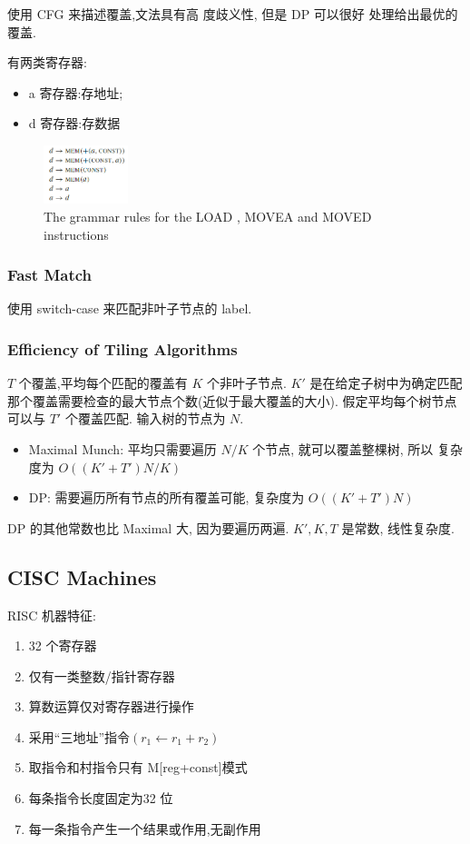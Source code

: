 使用 CFG 来描述覆盖,文法具有高 度歧义性, 但是 DP 可以很好 处理给出最优的覆盖.

有两类寄存器:
\begin{itemize}
    \item a 寄存器:存地址;
    \item d 寄存器:存数据
\end{itemize}

\begin{figure}[!htb]
    \centering
    \includegraphics[width=0.22\textwidth]{pic/CP9/The grammar rules}
    \caption{The grammar rules for the LOAD , MOVEA and MOVED instructions}
\end{figure}


\subsubsection{Fast Match}
使用 switch-case 来匹配非叶子节点的 label.


\subsubsection{Efficiency of Tiling Algorithms}
$T$ 个覆盖,平均每个匹配的覆盖有 $K$ 个非叶子节点. $K'$ 是在给定子树中为确定匹配那个覆盖需要检查的最大节点个数(近似于最大覆盖的大小). 假定平均每个树节点可以与 $T'$ 个覆盖匹配. 输入树的节点为 $N$.
\begin{itemize}
    \item Maximal Munch: 平均只需要遍历 $N/K$ 个节点, 就可以覆盖整棵树, 所以 复杂度为 $O((K'+T')N/K)$
    \item DP: 需要遍历所有节点的所有覆盖可能, 复杂度为 $O((K'+T')N)$
\end{itemize}
DP 的其他常数也比 Maximal 大, 因为要遍历两遍. $K',K,T$ 是常数, 线性复杂度.


\subsection{CISC Machines}

RISC 机器特征:
\begin{enumerate}
    \item 32 个寄存器
    \item 仅有一类整数/指针寄存器
    \item 算数运算仅对寄存器进行操作
    \item 采用``三地址''指令$(r_1\leftarrow r_1+r_2)$
    \item 取指令和村指令只有 M[reg+const]模式
    \item 每条指令长度固定为32 位
    \item 每一条指令产生一个结果或作用,无副作用
\end{enumerate}

